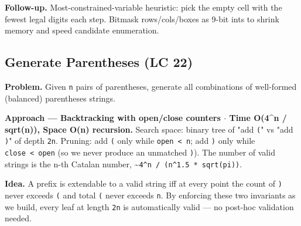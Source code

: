 \documentclass[11pt]{article}
\begin{document}
\textbf{Follow-up.} Most-constrained-variable heuristic: pick the empty cell with the fewest legal digits each step. Bitmask rows/cols/boxes as 9-bit ints to shrink memory and speed candidate enumeration.

\subsection{Generate Parentheses (LC 22)}\label{generate-parentheses-lc-22}

\textbf{Problem.} Given \texttt{n} pairs of parentheses, generate all combinations of well-formed (balanced) parentheses strings.

\textbf{Approach --- Backtracking with open/close counters \(\cdot\) Time O(4\^{}n / sqrt(n)), Space O(n) recursion.} Search space: binary tree of "add \texttt{(}" vs "add \texttt{)}" of depth \texttt{2n}. Pruning: add \texttt{(} only while \texttt{open\ \textless{}\ n}; add \texttt{)} only while \texttt{close\ \textless{}\ open} (so we never produce an unmatched \texttt{)}). The number of valid strings is the n-th Catalan number, \textasciitilde{}\texttt{4\^{}n\ /\ (n\^{}1.5\ *\ sqrt(pi))}.

\textbf{Idea.} A prefix is extendable to a valid string iff at every point the count of \texttt{)} never exceeds \texttt{(} and total \texttt{(} never exceeds \texttt{n}. By enforcing these two invariants as we build, every leaf at length \texttt{2n} is automatically valid --- no post-hoc validation needed.

\end{document}
